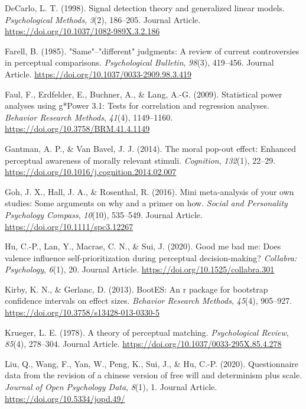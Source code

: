 \documentclass[
  english,
  man]{apa6}
\begin{document}
\leavevmode\hypertarget{ref-DeCarlo_1998}{}%
DeCarlo, L. T. (1998). Signal detection theory and generalized linear models. \emph{Psychological Methods}, \emph{3}(2), 186--205. Journal Article. \url{https://doi.org/10.1037/1082-989X.3.2.186}

\leavevmode\hypertarget{ref-Farell_1985}{}%
Farell, B. (1985). "Same"--"different" judgments: A review of current controversies in perceptual comparisons. \emph{Psychological Bulletin}, \emph{98}(3), 419--456. Journal Article. \url{https://doi.org/10.1037/0033-2909.98.3.419}

\leavevmode\hypertarget{ref-faul_statistical_2009}{}%
Faul, F., Erdfelder, E., Buchner, A., \& Lang, A.-G. (2009). Statistical power analyses using g*Power 3.1: Tests for correlation and regression analyses. \emph{Behavior Research Methods}, \emph{41}(4), 1149--1160. \url{https://doi.org/10.3758/BRM.41.4.1149}

\leavevmode\hypertarget{ref-gantman_moral_2014}{}%
Gantman, A. P., \& Van Bavel, J. J. (2014). The moral pop-out effect: Enhanced perceptual awareness of morally relevant stimuli. \emph{Cognition}, \emph{132}(1), 22--29. \url{https://doi.org/10.1016/j.cognition.2014.02.007}

\leavevmode\hypertarget{ref-Goh_2016_mini}{}%
Goh, J. X., Hall, J. A., \& Rosenthal, R. (2016). Mini meta-analysis of your own studies: Some arguments on why and a primer on how. \emph{Social and Personality Psychology Compass}, \emph{10}(10), 535--549. Journal Article. \url{https://doi.org/10.1111/spc3.12267}

\leavevmode\hypertarget{ref-Hu_2020_GoodSelf}{}%
Hu, C.-P., Lan, Y., Macrae, C. N., \& Sui, J. (2020). Good me bad me: Does valence influence self-prioritization during perceptual decision-making? \emph{Collabra: Psychology}, \emph{6}(1), 20. Journal Article. \url{https://doi.org/10.1525/collabra.301}

\leavevmode\hypertarget{ref-kirby_bootes_2013}{}%
Kirby, K. N., \& Gerlanc, D. (2013). BootES: An r package for bootstrap confidence intervals on effect sizes. \emph{Behavior Research Methods}, \emph{45}(4), 905--927. \url{https://doi.org/10.3758/s13428-013-0330-5}

\leavevmode\hypertarget{ref-Krueger_1978}{}%
Krueger, L. E. (1978). A theory of perceptual matching. \emph{Psychological Review}, \emph{85}(4), 278--304. Journal Article. \url{https://doi.org/10.1037/0033-295X.85.4.278}

\leavevmode\hypertarget{ref-Liu_2020_JOPD}{}%
Liu, Q., Wang, F., Yan, W., Peng, K., Sui, J., \& Hu, C.-P. (2020). Questionnaire data from the revision of a chinese version of free will and determinism plus scale. \emph{Journal of Open Psychology Data}, \emph{8}(1), 1. Journal Article. \url{https://doi.org/10.5334/jopd.49/}
\end{document}
